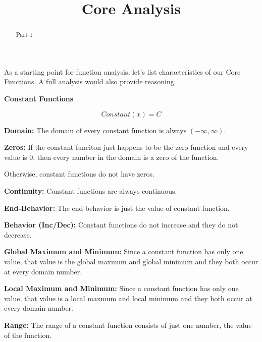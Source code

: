 \documentclass{ximera}
\title{Core Analysis}
\begin{document}
\begin{abstract}
Part 1
\end{abstract}
\maketitle




As a starting point for function analysis, let's list characteristics of our Core Functions. A full analysis would also provide reasoning.


\begin{explanation} \textbf{\textcolor{red!75!green}{Constant Functions}} 


\[ Constant(x) = C  \]



\textbf{Domain:} The domain of every constant function is always $(-\infty, \infty)$.

\textbf{Zeros:} If the constant funciton just happens to be the zero function and every value is $0$, then every number in the domain is a zero of the function.

Otherwise, constant functions do not have zeros.

\textbf{Continuity:} Constant functions are always continuous.

\textbf{End-Behavior:} The end-behavior is just the value of constant function.


\textbf{Behavior (Inc/Dec):} Constant functions do not increase and they do not decrease.

\textbf{Global Maximum and Minimum:} Since a constant function has only one value, that value is the global maxmum and global minimum and they both occur at every domain number.

\textbf{Local Maximum and Minimum:}  Since a constant function has only one value, that value is a local maxmum and local minimum and they both occur at every domain number.

\textbf{Range:} The range of a constant function consists of just one number, the value of the function.

\end{explanation}
\end{document}
